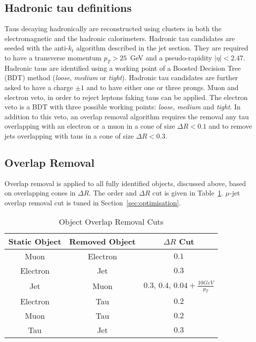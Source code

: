 \subsection{Hadronic tau definitions}
\label{subsec:hadtaudescription}
Taus decaying hadronically are reconstructed using clusters in both the electromagnetic and the 
hadronic calorimeters. Hadronic tau candidates are seeded with the anti-$k_t$ algorithm
described in the jet section. They are required to have a transverse momentum $p_T>25$~GeV and a
pseudo-rapidity $|\eta|<$2.47.
Hadronic taus are identified using %
a working point of a Boosted Decision Tree (BDT) method ({\it loose}, {\it
medium} or {\it tight}).
Hadronic tau candidates are further asked to have a charge $\pm1$ and to have either one or three prongs.
Muon and electron veto, in order to reject leptons faking taus can be applied. The electron veto is a BDT with three possible working points: {\it loose}, {\it medium} and {\it tight}. In addition to this veto, an
overlap removal algorithm requires the removal any tau overlapping with an
electron or a muon in a cone of size $\Delta R < 0.1$
and to remove jets overlapping with taus in a cone of size $\Delta R < 0.3$.

\subsection{Overlap Removal}
\label{subsec:hadtaudescription}
Overlap removal is applied to all fully identified objects, discussed above, based on overlapping cones in $\Delta R$.
The order and $\Delta R$ cut is given in Table~\ref{tab:overlap}. $\mu$-jet
overlap removal cut is tuned in Section~\ref{sec:optimisation}.%

\begin{table}[htbp]
  \begin{center} \label{tab:overlap}
    \caption{ Object Overlap Removal Cuts 
      } {\small
    \begin{tabular}{c|c|c} 
      \hline\hline
  Static Object & Removed Object  & $\Delta R$ Cut  \\
  \hline
  Muon &  Electron  & $0.1$  \\
  Electron &  Jet & $0.3$  \\
  Jet  &  Muon & $0.3$, $0.4$, $0.04 + \frac{10 GeV}{p_{T}}$  \\
  Electron &  Tau  & $0.2$  \\
  Muon &  Tau & $0.2$  \\
  Tau  &  Jet & $0.3$  \\

     \hline
    \end{tabular}}
  \end{center}
\end{table}



